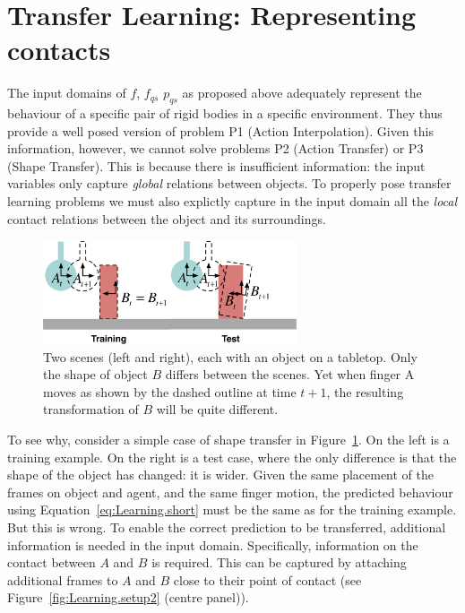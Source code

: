 \section{Transfer Learning: Representing contacts}
\label{sec:InfoForPrediction}

The input domains of $f$, $f_{qs}$ $p_{qs}$ as proposed above  adequately represent the behaviour of a specific pair of rigid bodies in a specific environment. They thus provide a well posed version of problem P1 (Action Interpolation). Given this information, however, we cannot solve problems P2 (Action Transfer) or P3 (Shape Transfer). This is because there is insufficient information: the input variables only capture {\em global} relations between objects. To properly pose transfer learning problems we must also explictly capture in the input domain all the {\em local} contact relations between the object and its surroundings. 

\begin{figure}[t]
\centerline{\includegraphics[width=7.5cm]{shapes-colour}}
\caption[Shapes]{Two scenes (left and right),
each with an object on a tabletop. Only the shape of object $B$ differs between the scenes. Yet when finger A moves as shown by the dashed outline at time $t+1$, the resulting transformation of $B$ will be quite different.}
\label{fig:Learning.shapes}
\end{figure}

To see why, consider a simple case of shape transfer in Figure~\ref{fig:Learning.shapes}. On the left is a training example. On the right is a test case, where the only difference is that the shape of the object has changed: it is wider. Given the same placement of the frames on object and agent, and the same finger motion, the predicted behaviour using Equation~\eqref{eq:Learning.short} must be the same as for the training example. But this is wrong. To enable the correct prediction to be transferred, additional information is needed in the input domain. Specifically, information on the contact between $A$ and $B$ is required. This can be captured by attaching additional frames to $A$ and $B$ close to their point of contact (see Figure~\ref{fig:Learning.setup2} (centre panel)).

